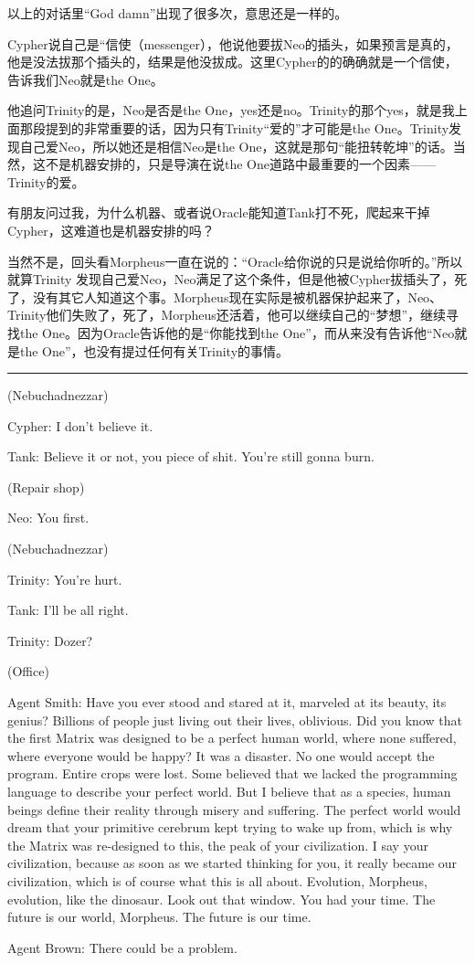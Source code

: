 \documentclass{ctexart}
\newcommand{\myparsep}{\noindent \rule[0.5ex]{\linewidth}{1pt}}
\newenvironment{myquote}{\color{green} \setlength{\leftskip}{6em} \setlength{\rightskip}{4em} \setlength{\parindent}{-2em}}{\par}
\begin{document}
以上的对话里“God damn”出现了很多次，意思还是一样的。

Cypher说自己是“信使（messenger），他说他要拔Neo的插头，如果预言是真的，他是没法拔那个插头的，结果是他没拔成。这里Cypher的的确确就是一个信使，告诉我们Neo就是the One。

他追问Trinity的是，Neo是否是the One，yes还是no。Trinity的那个yes，就是我上面那段提到的非常重要的话，因为只有Trinity“爱的”才可能是the One。Trinity发现自己爱Neo，所以她还是相信Neo是the One，这就是那句“能扭转乾坤”的话。当然，这不是机器安排的，只是导演在说the One道路中最重要的一个因素——Trinity的爱。

有朋友问过我，为什么机器、或者说Oracle能知道Tank打不死，爬起来干掉Cypher，这难道也是机器安排的吗？

当然不是，回头看Morpheus一直在说的：“Oracle给你说的只是说给你听的。”所以就算Trinity 发现自己爱Neo，Neo满足了这个条件，但是他被Cypher拔插头了，死了，没有其它人知道这个事。Morpheus现在实际是被机器保护起来了，Neo、Trinity他们失败了，死了，Morpheus还活着，他可以继续自己的“梦想”，继续寻找the One。因为Oracle告诉他的是“你能找到the One”，而从来没有告诉他“Neo就是the One”，也没有提过任何有关Trinity的事情。

\myparsep

\begin{myquote}
(Nebuchadnezzar)

Cypher: I don't believe it.

Tank: Believe it or not, you piece of shit. You're still gonna burn.

(Repair shop)

Neo: You first.

(Nebuchadnezzar)

Trinity: You're hurt.

Tank: I'll be all right.

Trinity: Dozer?

(Office)

Agent Smith: Have you ever stood and stared at it, marveled at its beauty, its genius? Billions of people just living out their lives, oblivious. Did you know that the first Matrix was designed to be a perfect human world, where none suffered, where everyone would be happy? It was a disaster. No one would accept the program. Entire crops were lost. Some believed that we lacked the programming language to describe your perfect world. But I believe that as a species, human beings define their reality through misery and suffering. The perfect world would dream that your primitive cerebrum kept trying to wake up from, which is why the Matrix was re-designed to this, the peak of your civilization. I say your civilization, because as soon as we started thinking for you, it really became our civilization, which is of course what this is all about. Evolution, Morpheus, evolution, like the dinosaur. Look out that window. You had your time. The future is our world, Morpheus. The future is our time.

Agent Brown: There could be a problem.
\end{myquote}
\end{document}
